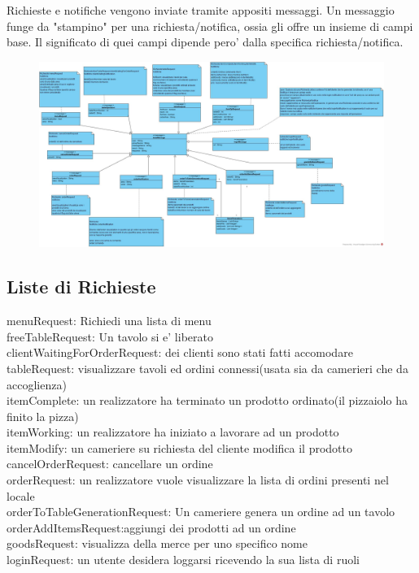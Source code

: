 Richieste e notifiche vengono inviate tramite appositi messaggi. Un messaggio funge da "stampino" per una richiesta/notifica, ossia gli offre un insieme di campi base. Il significato di quei campi dipende pero' dalla specifica richiesta/notifica.
\begin{figure}[H]
	\centering
	\includegraphics[width=1\textwidth]{Immagini/messages_api.jpg}
\end{figure}

\subsection{Liste di Richieste}
menuRequest: Richiedi una lista di menu
\\freeTableRequest: Un tavolo si e' liberato
\\clientWaitingForOrderRequest: dei clienti sono stati fatti accomodare
\\tableRequest: visualizzare tavoli ed ordini connessi(usata sia da camerieri che da accoglienza)
\\itemComplete: un realizzatore ha terminato un prodotto ordinato(il pizzaiolo ha finito la pizza)
\\itemWorking: un realizzatore ha iniziato a lavorare ad un prodotto
\\itemModify: un cameriere su richiesta del cliente modifica il prodotto
\\cancelOrderRequest: cancellare un ordine
\\orderRequest: un realizzatore vuole visualizzare la lista di ordini presenti nel locale
\\orderToTableGenerationRequest: Un cameriere genera un ordine ad un tavolo
\\orderAddItemsRequest:aggiungi dei prodotti ad un ordine
\\goodsRequest: visualizza della merce per  uno specifico nome
\\loginRequest: un utente desidera loggarsi ricevendo la sua lista di ruoli

